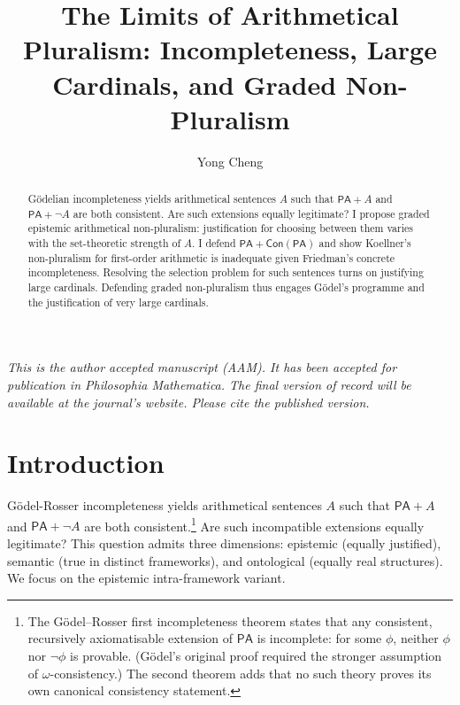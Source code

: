 \documentclass[a4paper,12pt]{amsart}
\title{The Limits of Arithmetical Pluralism: Incompleteness, Large Cardinals, and Graded Non-Pluralism}
\author{Yong Cheng}
\theoremstyle{definition}
\numberwithin{equation}{section}
\begin{document}
\begin{abstract}
G\"odelian incompleteness yields arithmetical sentences \(A\) such that \(\mathsf{PA}+A\) and \(\mathsf{PA}+\neg A\) are both consistent. Are such extensions equally legitimate? I propose graded epistemic arithmetical non-pluralism: justification for choosing between them varies with the set-theoretic strength of \(A\). I defend \(\mathsf{PA}+\mathsf{Con}(\mathsf{PA})\) and show Koellner's non-pluralism for first-order arithmetic is inadequate given Friedman's concrete incompleteness. Resolving the selection problem for such sentences turns on justifying large cardinals. Defending graded non-pluralism thus engages G\"odel's programme and the justification of very large cardinals. 
\end{abstract}


\maketitle

\noindent\small
\textit{This is the author accepted manuscript (AAM). It has been accepted for publication in \emph{Philosophia Mathematica}. The final version of record will be available at the journal's website. Please cite the published version.}
\vspace{1em}

\section{Introduction}\label{section1}
Gödel-Rosser incompleteness yields arithmetical sentences \(A\) such that \(\mathsf{PA} + A\) and \(\mathsf{PA} + \neg A\) are both consistent.\footnote{The G\"odel--Rosser first incompleteness theorem states that any consistent, recursively axiomatisable extension of \(\mathsf{PA}\) is incomplete: for some \(\phi\), neither \(\phi\) nor \(\neg\phi\) is provable. (G\"{o}del's original proof required the stronger assumption of \(\omega\)-consistency.) The second theorem adds that no such theory proves its own canonical consistency statement.} Are such incompatible extensions equally legitimate? This question admits three dimensions: epistemic (equally justified), semantic (true in distinct frameworks), and ontological (equally real structures). We focus on the epistemic intra-framework variant.
\end{document}
